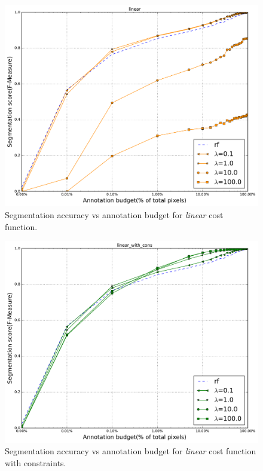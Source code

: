 \begin{figure}[h!] \label{fig:rf_vip2}
\centering
 \includegraphics[width=0.75\linewidth]{figures/linear.pdf} 
\caption{Segmentation accuracy vs annotation budget for \textit{linear} cost function.}
\end{figure}

\begin{figure}[h!] \label{fig:rf_vip3}
\centering
 \includegraphics[width=0.75\linewidth]{figures/linear_with_cons.pdf}
\caption{Segmentation accuracy vs annotation budget for \textit{linear} cost function with constraints.}
\end{figure}



